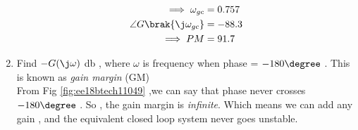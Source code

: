 \begin{enumerate}[label=\thesection.\arabic*.,ref=\thesection.\theenumi]
\begin{align}
\implies
\omega_{gc} &=  0.757  \\
\angle G\brak{\j\omega_{gc}} &= -88.3 \\
\implies
PM &= 91.7  
\end{align}

\item Find $-G(\j\omega)  $ db , where $\omega$ is frequency when phase = $-180\degree$ . This is known as  {\em gain margin} (GM)
\\
\solution From Fig \ref{fig:ee18btech11049} ,we can say that phase  never crosses $-180\degree$ .
So , the gain margin is {\em infinite}.
Which means we can add any gain , and the equivalent closed loop system never goes unstable.

\end{enumerate}
